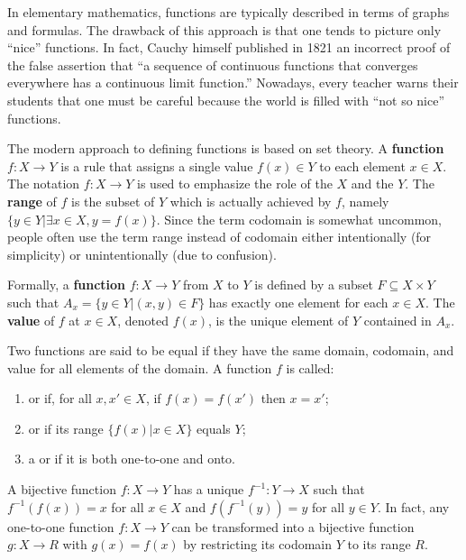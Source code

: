 In elementary mathematics, functions are typically described in terms of graphs and formulas.
The drawback of this approach is that one tends to picture only ``nice'' functions.
In fact, Cauchy himself published in 1821 an incorrect proof of the false assertion that ``a sequence of continuous functions that converges everywhere has a continuous limit function.''
Nowadays, every teacher warns their students that one must be careful because the world is filled with ``not so nice'' functions.

The modern approach to defining functions is based on set theory.
A \textbf{function} $f \colon X\rightarrow Y$ is a rule that assigns a single value $f(x)\in Y$ to each element $x\in X$.
The notation $f \colon X \rightarrow Y$ is used to emphasize the role of the  $X$ and the  $Y$.
The \textbf{range} of $f$ is the subset of $Y$ which is actually achieved by $f$, namely $\{y \in Y | \exists x\in X, y=f(x) \}$.
Since the term codomain is somewhat uncommon, people often use the term range instead of codomain either intentionally (for simplicity) or unintentionally (due to confusion).

\begin{definition}
Formally, a \textbf{function} $f \colon X \rightarrow Y$ from $X$ to $Y$ is defined by a subset $F \subseteq X \times Y$ such that $A_x = \{ y\in Y | (x,y)\in F \}$ has exactly one element for each $x\in X$.
The \textbf{value} of $f$ at $x\in X$, denoted $f(x)$, is the unique element of $Y$ contained in $A_x$.
\end{definition}

Two functions are said to be equal if they have the same domain, codomain, and value for all elements of the domain.
A function $f$ is called:
\begin{enumerate}
\item {} or  if, for all $x,x'\in X$, if $f(x)=f(x')$ then $x=x'$;
\item {} or  if its range $\{ f(x) | x\in X\}$ equals $Y$;
\item a  or  if it is both one-to-one and onto.
\end{enumerate}
A bijective function $f \colon X\rightarrow Y$ has a unique  $f^{-1} \colon Y\rightarrow X$ such that $f^{-1}(f(x)) = x$ for all $x\in X$ and $f(f^{-1}(y)) = y$ for all $y\in Y$.
In fact, any one-to-one function $f \colon X\rightarrow Y$ can be transformed into a bijective function $g \colon X \rightarrow R$ with $g(x)=f(x)$ by restricting its codomain $Y$ to its range $R$.

